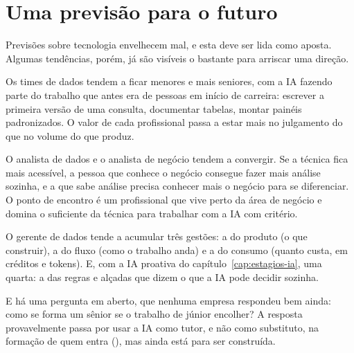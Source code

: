 \section{Uma previsão para o futuro}
\label{sec:previsao-times}

Previsões sobre tecnologia envelhecem mal, e esta deve ser lida como aposta. Algumas
tendências, porém, já são visíveis o bastante para arriscar uma direção.

Os times de dados tendem a ficar menores e mais seniores, com a IA fazendo parte do trabalho
que antes era de pessoas em início de carreira: escrever a primeira versão de uma consulta,
documentar tabelas, montar painéis padronizados. O valor de cada profissional passa a estar
mais no julgamento do que no volume do que produz.

O analista de dados e o analista de negócio tendem a convergir. Se a técnica fica mais
acessível, a pessoa que conhece o negócio consegue fazer mais análise sozinha, e a que sabe
análise precisa conhecer mais o negócio para se diferenciar. O ponto de encontro é um
profissional que vive perto da área de negócio e domina o suficiente da técnica para
trabalhar com a IA com critério.

O gerente de dados tende a acumular três gestões: a do produto (o que construir), a do fluxo
(como o trabalho anda) e a do consumo (quanto custa, em créditos e tokens). E, com a IA
proativa do capítulo~\ref{cap:estagios-ia}, uma quarta: a das regras e alçadas que dizem o
que a IA pode decidir sozinha.

E há uma pergunta em aberto, que nenhuma empresa respondeu bem ainda: como se forma um sênior
se o trabalho de júnior encolher? A resposta provavelmente passa por usar a IA como tutor, e
não como substituto, na formação de quem entra (), mas ainda está para ser
construída.


\begin{leituras}
\end{leituras}
